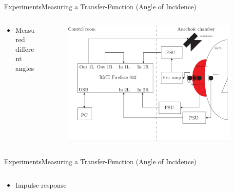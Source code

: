 \begin{frame}{Experiments}{Measuring a Transfer-Function (Angle of Incidence)}		
	\begin{columns}
		\begin{column}{0.3\textwidth}
			\begin{itemize}
				\item Measured different angles
			\end{itemize}
		\end{column}
		\begin{column}{0.7\textwidth} 
			\begin{figure}[h]
				\includegraphics[width=1\textwidth]{figures/AngleOfIncidenceSetup.pdf}
			\end{figure}
		\end{column}
	\end{columns}
\end{frame}
\begin{frame}{Experiments}{Measuring a Transfer-Function (Angle of Incidence)}
	\begin{columns}
	\begin{column}{1\textwidth}
		\begin{itemize}
			\item Impulse response
		\end{itemize}
		\begin{figure}[h]
			
		\end{figure}
	\end{column}
\end{columns}
\end{frame}

